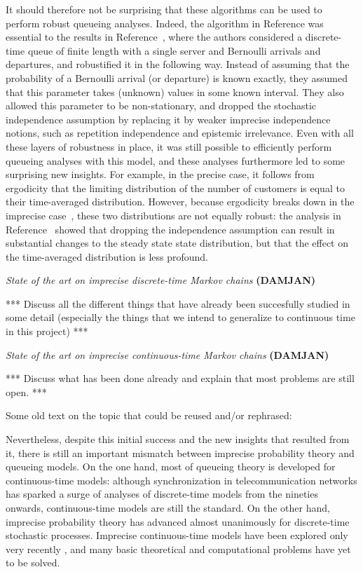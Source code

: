 \documentclass[11pt,dvipsnames,usenames,a4paper]{article}
\begin{document}
{It should therefore not be surprising that these algorithms can be used to perform robust queueing analyses. Indeed, the algorithm in Reference \cite{cooman2008} was essential to the results in Reference~\cite{2015Lopatatzidis}, where the authors considered a discrete-time queue of finite length with a single server and Bernoulli arrivals and departures, and robustified it in the following way.
Instead of assuming that the probability of a Bernoulli arrival (or departure) is known exactly, they assumed that this parameter takes (unknown) values in some known interval. They also allowed this parameter to be non-stationary, and dropped the stochastic independence assumption by replacing it by weaker imprecise independence notions, such as repetition independence and epistemic irrelevance.
Even with all these layers of robustness in place, it was still possible to efficiently perform queueing analyses with this model, and these analyses furthermore led to some surprising new insights. For example, in the precise case, it follows from ergodicity that the limiting distribution of the number of customers is equal to their time-averaged distribution. However, because ergodicity breaks down in the imprecise case~\cite{deCooman2015}, these two distributions are not equally robust: the analysis in Reference~\cite{2015Lopatatzidis} showed that dropping the independence assumption can result in substantial changes to the steady state state distribution, but that the effect on the time-averaged distribution is less profound.
}



\emph{State of the art on imprecise discrete-time Markov chains} {\bf\color{blue} (DAMJAN)}

*** Discuss all the different things that have already been succesfully studied in some detail (especially the things that we intend to generalize to continuous time in this project) ***


\emph{State of the art on imprecise continuous-time Markov chains} {\bf\color{blue} (DAMJAN)}

*** Discuss what has been done already and explain that most problems are still open. ***


{\color{Gray}
Some old text on the topic that could be reused and/or rephrased:



Nevertheless, despite this initial success and the new insights that resulted from it, there is still an important mismatch between imprecise probability theory and queueing models.
On the one hand, most of queueing theory is developed for continuous-time models: although synchronization in telecommunication networks has sparked a surge of analyses of discrete-time models from the nineties onwards, continuous-time models are still the standard.
On the other hand, imprecise probability theory has advanced almost unanimously for discrete-time stochastic processes.
Imprecise continuous-time models have been explored only very recently \cite{Skulj2015,Troffaes+GSB-ISIPTA15p}, and many basic theoretical and computational problems have yet to be solved.
}
\end{document}
